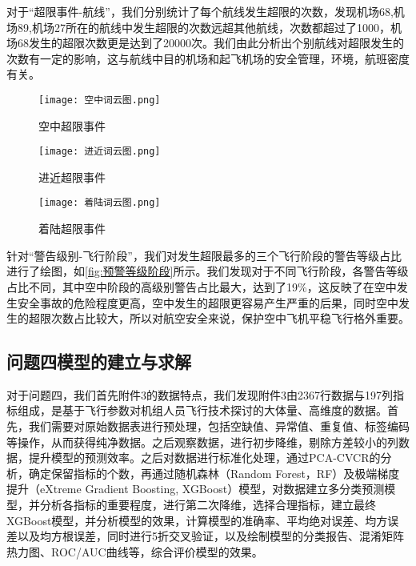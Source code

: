 \documentclass{MathorCupModeling}
\begin{document}
	对于“超限事件-航线”，我们分别统计了每个航线发生超限的次数，发现机场68,机场89,机场27所在的航线中发生超限的次数远超其他航线，次数都超过了1000，机场68发生的超限次数更是达到了20000次。我们由此分析出个别航线对超限发生的次数有一定的影响，这与航线中目的机场和起飞机场的安全管理，环境，航班密度有关。
	\begin{figure}[H]
		\centering
		\begin{minipage}{0.30\linewidth}
			\centering
			\texttt{[image: 空中词云图.png]}
			\caption{空中超限事件}
			\label{fig:空中词云图}
		\end{minipage}
		\begin{minipage}{0.30\linewidth}
			\centering
			\texttt{[image: 进近词云图.png]}
			\caption{进近超限事件}
			\label{fig:进近词云图}
		\end{minipage}
		\begin{minipage}{0.30\linewidth}
			\centering
			\texttt{[image: 着陆词云图.png]}
			\caption{着陆超限事件}
			\label{fig:着陆词云图}
		\end{minipage}
	\end{figure}
	针对“警告级别-飞行阶段”，我们对发生超限最多的三个飞行阶段的警告等级占比进行了绘图，如\textcolor{blue}{\cref{fig:预警等级阶段}}所示。我们发现对于不同飞行阶段，各警告等级占比不同，其中空中阶段的高级别警告占比最大，达到了19\%，这反映了在空中发生安全事故的危险程度更高，空中发生的超限更容易产生严重的后果，同时空中发生的超限次数占比较大，所以对航空安全来说，保护空中飞机平稳飞行格外重要。

	\subsection{问题四模型的建立与求解}
	对于问题四，我们首先附件3的数据特点，我们发现附件3由2367行数据与197列指标组成，是基于飞行参数对机组人员飞行技术探讨的大体量、高维度的数据。首先，我们需要对原始数据表进行预处理，包括空缺值、异常值、重复值、标签编码等操作，从而获得纯净数据。之后观察数据，进行初步降维，剔除方差较小的列数据，提升模型的预测效率。之后对数据进行标准化处理，通过PCA-CVCR的分析，确定保留指标的个数，再通过随机森林（Random Forest，RF）及极端梯度提升（eXtreme Gradient Boosting, XGBoost）模型，对数据建立多分类预测模型，并分析各指标的重要程度，进行第二次降维，选择合理指标，建立最终XGBoost模型，并分析模型的效果，计算模型的准确率、平均绝对误差、均方误差以及均方根误差，同时进行5折交叉验证，以及绘制模型的分类报告、混淆矩阵热力图、ROC/AUC曲线等，综合评价模型的效果。
\end{document}

